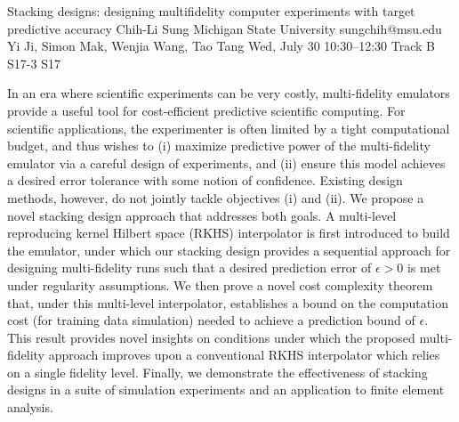 \begin{talk}
  {Stacking designs: designing multifidelity computer experiments with target predictive accuracy}%
  {Chih-Li Sung}%
  {Michigan State University}%
  {sungchih@msu.edu}%
  {Yi Ji, Simon Mak, Wenjia Wang, Tao Tang}%
  {}%
  {Wed, July 30 10:30–12:30 Track B}%
  {S17-3}%
  {S17}%
  
				
			
In an era where scientific experiments can be very costly, multi-fidelity emulators provide a useful tool for cost-efficient predictive scientific computing. For scientific applications, the experimenter is often limited by a tight computational budget, and thus wishes to (i) maximize predictive power of the multi-fidelity emulator via a careful design of experiments, and (ii) ensure this model achieves a desired error tolerance with some notion of confidence. Existing design methods, however, do not jointly tackle objectives (i) and (ii). We propose a novel stacking design approach that addresses both goals. A  multi-level reproducing kernel Hilbert space (RKHS) interpolator is first introduced to build the emulator, under which our stacking design provides a sequential approach for designing multi-fidelity runs such that a desired prediction error of $\epsilon > 0$ is met under regularity assumptions. We then prove a novel cost complexity theorem that, under this multi-level interpolator, establishes a bound on the computation cost (for training data simulation) needed to achieve a prediction bound of $\epsilon$. This result provides novel insights on conditions under which the proposed multi-fidelity approach improves upon a conventional RKHS interpolator which relies on a single fidelity level. Finally, we demonstrate the effectiveness of stacking designs in a suite of simulation experiments and an application to finite element analysis.

\end{talk}

